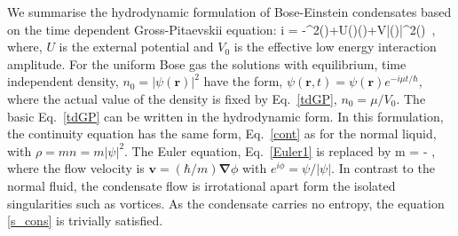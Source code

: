 We summarise the hydrodynamic formulation of Bose-Einstein condensates based on the 
time dependent Gross-Pitaevskii equation\cite{Pethic}:
\be\label{tdGP}
i \hbar {} = -\nabla^2\psi()+U()\psi()+V|\psi()|^2\psi()\, ,
\ee
where, $U$ is the external potential and $V_0$ is the effective low energy interaction amplitude.%
For the uniform Bose gas the solutions with equilibrium, time independent density, $n_0 = |\psi(\bm{r})|^2$ have the form, 
$\psi(\bm{r},t) = \psi(\bm{r}) e^{ - i \mu t /\hbar}$, where the actual value of the density is fixed by Eq.~\eqref{tdGP},
$n_0 = \mu/V_0$.
The basic Eq.~\eqref{tdGP} can be written in the hydrodynamic form.
In this formulation, the continuity equation has the same form, Eq.~\eqref{cont} as for the normal liquid, with
$\rho = m n = m |\psi|^2$.
The Euler equation, Eq.~\eqref{Euler1} is replaced by 
\be\label{Euler2}
m  = - \bm{\nabla},
\ee
where the flow velocity is $\bm{v} = (\hbar/m) \bm{\nabla} \phi$ with $e^{ i \phi} = \psi/|\psi|$.
In contrast to the normal fluid, the condensate flow is irrotational apart form the isolated singularities such as vortices.
As the condensate carries no entropy, the equation \eqref{s_cons} is trivially satisfied. 

